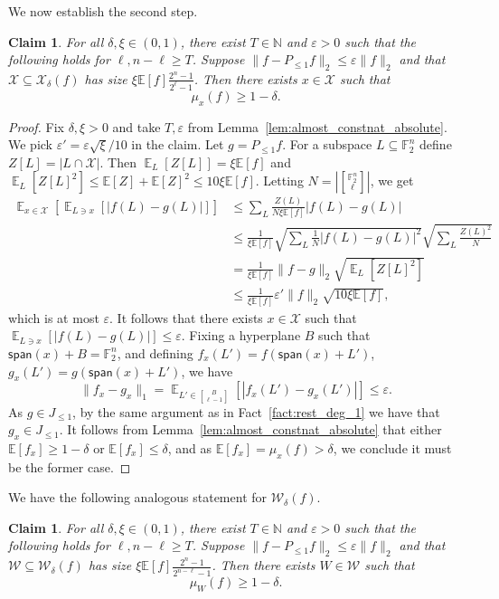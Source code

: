\documentclass[11pt]{article}
\newtheorem{claim}[thm]{Claim}
\newcommand\E{\mathbb{E}}
\newcommand\card[1]{\left| {#1} \right|}
\newcommand\norm[1]{\| #1 \|}
\newcommand\Expect[2]{{\mathop{\mathbb{E}}_{#1}\left[ {#2} \right]}}
\newcommand\eps{\varepsilon}
\renewcommand\geq{\geqslant}
\renewcommand\leq{\leqslant}
\providecommand{\sqbinom}[2]{\genfrac{[}{]}{0pt}{}{#1}{#2}}
\begin{document}
We now establish the second step.
\begin{claim}\label{claim:get_zoom_in_to_1}
    For all $\delta,\xi\in(0,1)$, there exist $T\in\mathbb{N}$ and $\eps>0$ such that the following holds for $\ell,n-\ell\geq T$.
    Suppose $\norm{f-P_{\leq 1}f}_2\leq \eps\norm{f}_2$ and that $\mathcal{X}\subseteq \mathcal{X}_{\delta}(f)$ has size $\xi\E[f] \frac{2^{n}-1}{2^{\ell}-1}$. Then there exists $x\in \mathcal{X}$ such that
    \[
    \mu_x(f)\geq 1-\delta.
    \]
\end{claim}
\begin{proof}
    Fix $\delta,\xi>0$ and take $T,\eps$ from Lemma~\ref{lem:almost_constnat_absolute}. We pick $\eps' = \eps\sqrt{\xi}/10$ in the claim.
    Let $g = P_{\leq 1}f$. 
    For a subspace $L\subseteq\mathbb{F}_2^n$ define $Z[L] = \card{L\cap \mathcal{X}}$. 
    Then $\Expect{L}{Z[L]}=\xi\E[f]$ and 
    $\Expect{L}{Z[L]^2}\leq
    \E[Z]+\E[Z]^2\leq 10\xi \E[f]$.
    Letting $N = \card{{\sqbinom{\mathbb{F}_2^n}{\ell}}}$, we get
    \begin{align*}
    \Expect{x\in \mathcal{X}}{\Expect{L\ni x}{\card{f(L)-g(L)}}}
    &\leq 
    \sum\limits_{L}\frac{Z(L)}{N\xi\E[f]}\card{f(L)-g(L)}\\
    &\leq 
    \frac{1}{\xi\E[f]}\sqrt{\sum\limits_{L}\frac{1}{N}\card{f(L)-g(L)}^2}
    \sqrt{\sum\limits_{L}\frac{Z(L)^2}{N}}\\
    &=\frac{1}{\xi\E[f]}\norm{f-g}_2\sqrt{\Expect{L}{Z[L]^2}}\\
    &\leq \frac{1}{\xi\E[f]}
    \eps'\norm{f}_2 \sqrt{10\xi\E[f]},
    \end{align*}
    which is at most $\eps$.
    It follows that there exists $x\in \mathcal{X}$ such that 
    $\Expect{L\ni x}{\card{f(L)-g(L)}}\leq \eps$. Fixing a hyperplane $B$ such that $\mathsf{span}(x)+B = \mathbb{F}_2^n$, and defining 
    $f_x(L') = f(\mathsf{span}(x)+L')$, 
    $g_x(L') = g(\mathsf{span}(x)+L')$, we have
    \[
    \norm{f_x-g_x}_1=\Expect{L'\in \sqbinom{B}{\ell-1}}{\card{f_x(L')-g_x(L')}}\leq \eps.
    \]
    As $g\in J_{\leq 1}$, by the same argument as in Fact~\ref{fact:rest_deg_1} we have that $g_x\in J_{\leq 1}$. It follows from Lemma~\ref{lem:almost_constnat_absolute} that either $\E[f_{x}]\geq 1-\delta$ or $\E[f_x]\leq \delta$, and as $\E[f_x] = \mu_x(f)> \delta$, we conclude it must be the former case.
\end{proof}
We have the following analogous statement for $\mathcal{W}_{\delta}(f)$.
\begin{claim}\label{claim:get_zoom_ot_to_1}
    For all $\delta,\xi \in(0,1)$, there exist $T\in\mathbb{N}$ and $\eps>0$ such that the following holds for $\ell,n-\ell\geq T$.
    Suppose $\norm{f-P_{\leq 1}f}_2\leq \eps\norm{f}_2$ and that $\mathcal{W}\subseteq \mathcal{W}_{\delta}(f)$ has size $\xi\E[f] \frac{2^{n}-1}{2^{n-\ell}-1}$. Then there exists $W\in \mathcal{W}$ such that
    \[
    \mu_W(f)\geq 1-\delta.
    \]
\end{claim}
\end{document}
